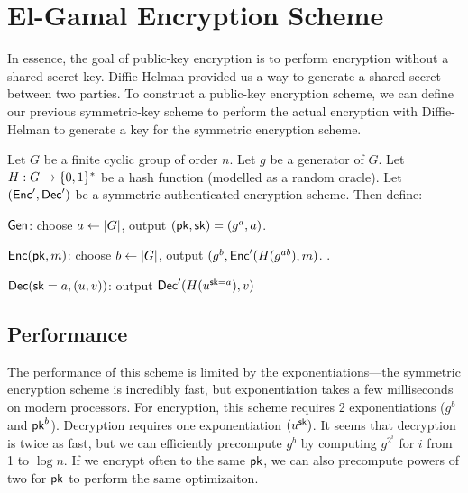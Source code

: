 \section{El-Gamal Encryption Scheme}
In essence, the goal of public-key encryption is to perform encryption without a shared secret key. Diffie-Helman provided us a way to generate a shared secret between two parties. To construct a public-key encryption scheme, we can define our previous symmetric-key scheme to perform the actual encryption with Diffie-Helman to generate a key for the symmetric encryption scheme. 


\begin{definition}[El-Gamal]
	Let $G$ be a finite cyclic group of order $n$. Let $g$ be a generator of $G$. Let $H: G \rightarrow \{0,1\}^*$ be a hash function (modelled as a random oracle). Let $(\mathsf{Enc}', \mathsf{Dec}')$ be a symmetric authenticated encryption scheme. Then define:

	\begin{compactitem}
		\item $\mathsf{Gen}$: choose $a \gets \left| G \right|$, output $(\mathsf{pk}, {\mathsf{sk}}) = (g^a, a)$.	
		\item $\mathsf{Enc}(\mathsf{pk}, m)$: choose $b \gets \left| G \right|$, output $(g^b, \mathsf{Enc}'(H(g^{ab}), m)$. .
		\item $\mathsf{Dec}({\mathsf{sk}}=a, (u, v))$: output $\mathsf{Dec}'(H(u^{{\mathsf{sk}}=a}), v)$ 
	\end{compactitem}
\end{definition}

\subsection{Performance}
The performance of this scheme is limited by the exponentiations---the symmetric encryption scheme is incredibly fast, but exponentiation takes a few milliseconds on modern processors. For encryption, this scheme requires 2 exponentiations ($g^b$ and $\mathsf{pk}^b$). Decryption requires one exponentiation $(u^{\mathsf{sk}})$. It seems that decryption is twice as fast, but we can efficiently precompute $g^b$ by computing $g^{2^i}$ for $i$ from 1 to $\log n$. If we encrypt often to the same $\mathsf{pk}$, we can also precompute powers of two for $\mathsf{pk}$ to perform the same optimizaiton.

